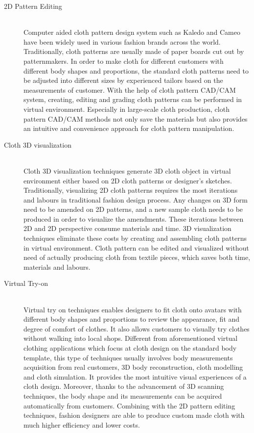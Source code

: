 \begin{description}
  \item[2D Pattern Editing] \hfill \\
 Computer aided cloth pattern design system such as Kaledo and Cameo have been widely used in various fashion brands across the world. Traditionally, cloth patterns are usually made of paper boards cut out by patternmakers. In order to make cloth for different customers with different body shapes and proportions, the standard cloth patterns need to be adjusted into different sizes by experienced tailors based on the measurements of customer. With the help of cloth pattern CAD/CAM system, creating, editing and grading cloth patterns can be performed in virtual environment. Especially in large-scale cloth production, cloth pattern CAD/CAM methods not only save the materials but also provides an intuitive and convenience approach for cloth pattern manipulation. 
     

  \item[Cloth 3D visualization] \hfill \\
  Cloth 3D visualization techniques generate 3D cloth object in virtual environment either based on 2D cloth patterns or designer's sketches. Traditionally, visualizing 2D cloth patterns requires the most iterations and labours in traditional fashion design process. Any changes on 3D form need to be amended on 2D patterns, and a new sample cloth needs to be produced in order to visualize the amendments. These iterations between 2D and 2D perspective consume materials and time. 3D visualization techniques eliminate these costs by creating and assembling cloth patterns in virtual environment. Cloth pattern can be edited and visualized without need of actually producing cloth from textile pieces, which saves both time, materials and labours. 
  
   \item[Virtual Try-on] \hfill \\
   Virtual try on techniques enables designers to fit cloth onto avatars with different body shapes and proportions to review the appearance, fit and degree of comfort of clothes. It also allows customers to visually try clothes without walking into local shops. Different from aforementioned virtual clothing applications which focus at cloth design on the standard body template, this type of techniques usually involves body measurements acquisition from real customers, 3D body reconstruction, cloth modelling and cloth simulation. It provides the most intuitive visual experiences of a cloth design. Moreover, thanks to the advancement of 3D scanning techniques, the body shape and its measurements can be acquired automatically from customers. Combining with the 2D pattern editing techniques, fashion designers are able to produce custom made cloth with much higher efficiency and lower costs. 


\end{description}
